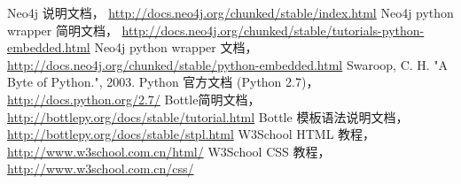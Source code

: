 \documentclass{yaldc}
\begin{document}
\begin{thebibliography}{9}
     Neo4j 说明文档，
        \url{http://docs.neo4j.org/chunked/stable/index.html}
     Neo4j python wrapper 简明文档，
        \url{http://docs.neo4j.org/chunked/stable/tutorials-python-embedded.html}
     Neo4j python wrapper 文档，
        \url{http://docs.neo4j.org/chunked/stable/python-embedded.html}
     Swaroop, C. H. "A Byte of Python.", 2003.
     Python 官方文档 (Python 2.7)，
        \url{http://docs.python.org/2.7/}
     Bottle简明文档，
        \url{http://bottlepy.org/docs/stable/tutorial.html}
     Bottle 模板语法说明文档，
        \url{http://bottlepy.org/docs/stable/stpl.html}
     W3School HTML 教程，
        \url{http://www.w3school.com.cn/html/}
     W3School CSS 教程，
        \url{http://www.w3school.com.cn/css/}
\end{thebibliography}
\end{document}
